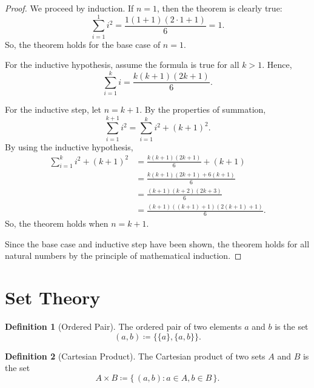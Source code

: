 \documentclass[headings=standardclasses]{scrartcl}
\theoremstyle{definition}
\newtheorem{definition}{Definition}
\begin{document}
\begin{proof}
  We proceed by induction. If \(n = 1\), then the theorem is clearly true:
  \begin{equation*}
    ∑_{i = 1}^1 i^2 = \frac{1(1 + 1)(2 ⋅1 + 1)}{6} = 1.
  \end{equation*}
  So, the theorem holds for the base case of \(n = 1\).

  For the inductive hypothesis, assume the formula is true for all \(k > 1\).
  Hence,
  \begin{equation*}
    ∑_{i = 1}^k i = \frac{k(k + 1)(2k + 1)}{6}.
  \end{equation*}

  For the inductive step, let \(n = k + 1\). By the properties of summation,
  \begin{equation*}
    ∑_{i = 1}^{k + 1} i^2 = ∑_{i = 1}^k i^2 + {(k + 1)}^2.
  \end{equation*}
  By using the inductive hypothesis,
  \begin{equation*}
  \begin{split}
    ∑_{i = 1}^k i^2 + {(k + 1)}^2 &= \frac{k(k + 1)(2k + 1)}{6} + (k + 1) \\
                                  &= \frac{k(k + 1)(2k + 1) + 6(k + 1)}{6} \\
                                  &= \frac{(k + 1)(k + 2)(2k + 3)}{6} \\
                                  &= \frac{(k + 1)((k + 1) + 1)(2(k + 1) + 1)}{6}.
  \end{split}
  \end{equation*}
  So, the theorem holds when \(n = k + 1\).

  Since the base case and inductive step have been shown, the theorem holds for
  all natural numbers by the principle of mathematical induction.
\end{proof}

\section*{Set Theory}

\begin{definition}[Ordered Pair]\label{def:ordered_pair}
  The ordered pair of two elements \(a\) and \(b\) is the set
  \[ (a, b) ≔ \{\{a\}, \{a, b\}\}. \]
\end{definition}

\begin{definition}[Cartesian Product]\label{def:cartesian_product}
  The Cartesian product of two sets \(A\) and \(B\) is the set
  \[ A × B ≔ \{\, (a, b) : a ∈ A, b ∈ B \,\}. \]
\end{definition}
\end{document}
